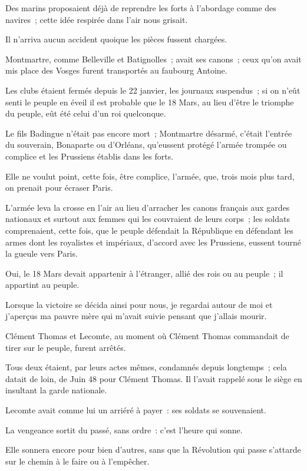 \documentclass[french,twoside]{book} %
\begin{document}
Des marins proposaient déjà de reprendre les forts à l’abordage comme des navires ; cette idée respirée dans l’air nous grisait.\par
Il n’arriva aucun accident quoique les pièces fussent chargées.\par
Montmartre, comme Belleville et Batignolles ; avait ses canons ; ceux qu’on avait mis place des Vosges furent transportés au faubourg Antoine.\par
Les clubs étaient fermés depuis le 22 janvier, les journaux suspendus ; si on n’eût senti le peuple en éveil il est probable que le 18 Mars, au lieu d’être le triomphe du peuple, eût été celui d’un roi quelconque.\par
Le fils Badingue n’était pas encore mort ; Montmartre désarmé, c’était l’entrée du souverain, Bonaparte ou d’Orléans, qu’eussent protégé l’armée trompée ou complice et les Prussiens établis dans les forts.\par
Elle ne voulut point, cette fois, être complice,  l’armée, que, trois mois plus tard, on prenait pour écraser Paris.\par
L’armée leva la crosse en l’air au lieu d’arracher les canons français aux gardes nationaux et surtout aux femmes qui les couvraient de leurs corps ; les soldats comprenaient, cette fois, que le peuple défendait la République en défendant les armes dont les royalistes et impériaux, d’accord avec les Prussiens, eussent tourné la gueule vers Paris.\par
Oui, le 18 Mars devait appartenir à l’étranger, allié des rois ou au peuple ; il appartint au peuple.\par
Lorsque la victoire se décida ainsi pour nous, je regardai autour de moi et j’aperçus ma pauvre mère qui m’avait suivie pensant que j’allais mourir.\par
Clément Thomas et Lecomte, au moment où Clément Thomas commandait de tirer sur le peuple, furent arrêtés.\par
Tous deux étaient, par leurs actes mêmes, condamnés depuis longtemps ; cela datait de loin, de Juin 48 pour Clément Thomas. Il l’avait rappelé sous le siège en insultant la garde nationale.\par
Lecomte avait comme lui un arriéré à payer : ses soldats se souvenaient.\par
La vengeance sortit du passé, sans ordre : c’est l’heure qui sonne.\par
 Elle sonnera encore pour bien d’autres, sans que la Révolution qui passe s’attarde sur le chemin à le faire ou à l’empêcher.\par
\end{document}
